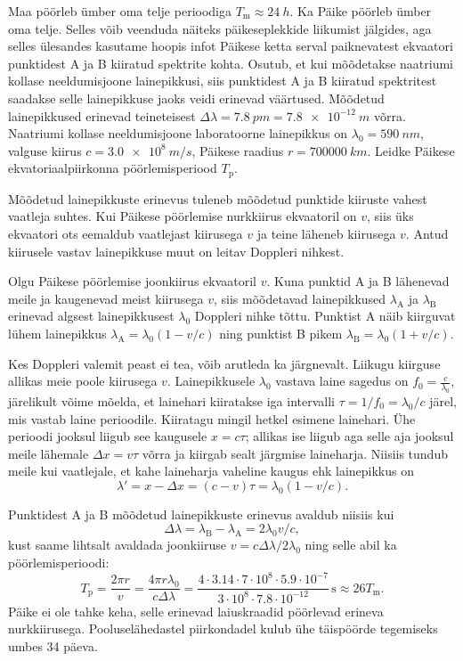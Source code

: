 
Maa pöörleb ümber oma telje perioodiga $T_\text{m}\approx\SI{24}{h}$. Ka Päike pöörleb ümber oma telje. Selles võib veenduda näiteks päikeseplekkide liikumist jälgides, aga selles ülesandes kasutame hoopis infot Päikese ketta serval paiknevatest ekvaatori punktidest A ja B kiiratud spektrite kohta. Osutub, et kui mõõdetakse naatriumi kollase neeldumisjoone lainepikkusi, siis punktidest A ja B kiiratud spektritest saadakse selle lainepikkuse jaoks veidi erinevad väärtused. Mõõdetud lainepikkused erinevad teineteisest $\Delta \lambda = \SI{7.8}{pm}=\SI{7.8e-12}{m}$ võrra. Naatriumi kollase neeldumisjoone laboratoorne lainepikkus on $\lambda_0=\SI{590}{nm}$, valguse kiirus $c=\SI{3.0e8}{m/s}$, Päikese raadius $r=\SI{700000}{km}$. Leidke Päikese ekvatoriaalpiirkonna pöörlemisperiood $T_\text{p}$.

\hint
Mõõdetud lainepikkuste erinevus tuleneb mõõdetud punktide kiiruste vahest vaatleja suhtes. Kui Päikese pöörlemise nurkkiirus ekvaatoril on $v$, siis üks ekvaatori ots eemaldub vaatlejast kiirusega $v$ ja teine läheneb kiirusega $v$. Antud kiirusele vastav lainepikkuse muut on leitav Doppleri nihkest.

\solu
Olgu Päikese pöörlemise joonkiirus ekvaatoril $v$. Kuna punktid A ja B lähenevad meile ja kaugenevad meist kiirusega $v$, siis mõõdetavad lainepikkused $\lambda_\text{A}$ ja $\lambda_\text{B}$ erinevad algsest lainepikkusest $\lambda_0$ Doppleri nihke tõttu. Punktist A näib kiirguvat lühem lainepikkus $\lambda_\text{A}=\lambda_0(1-v/c)$ ning punktist B pikem $\lambda_\text{B}=\lambda_0(1+v/c)$.

Kes Doppleri valemit peast ei tea, võib arutleda ka järgnevalt. Liikugu kiirguse allikas meie poole kiirusega $v$. Lainepikkusele $\lambda_0$ vastava laine sagedus on $f_0=\frac{c}{\lambda_0}$, järelikult võime mõelda, et lainehari kiiratakse iga intervalli $\tau = 1/f_0 = \lambda_0/c$ järel, mis vastab laine perioodile. Kiiratagu mingil hetkel esimene lainehari. Ühe perioodi jooksul liigub see kaugusele $x=c\tau$; allikas ise liigub aga selle aja jooksul meile lähemale $\Delta x = v\tau$ võrra ja kiirgab sealt järgmise laineharja. Niisiis tundub meile kui vaatlejale, et kahe laineharja vaheline kaugus ehk lainepikkus on 
\[
\lambda'=x-\Delta x=(c-v)\tau = \lambda_0(1-v/c).
\]

Punktidest A ja B mõõdetud lainepikkuste erinevus avaldub niisiis kui 
\[
\Delta\lambda = \lambda_\text{B}-\lambda_\text{A} = 2\lambda_0 v/c,
\]
kust saame lihtsalt avaldada joonkiiruse $v=c\Delta\lambda/2\lambda_0$ ning selle abil ka pöörlemisperioodi:
\[
T_\text{p}=\frac{2\pi r}{v}=\frac{4 \pi r \lambda_0}{c\Delta \lambda}=
\frac{4 \cdot 3.14 \cdot 7\cdot 10^8 \cdot 5.9 \cdot 10^{-7}}{3\cdot 10^8\cdot 7.8\cdot 10^{-12}}\,\text{s}\approx 26 \textit{T}_\mathrm{m}.
\]
Päike ei ole tahke keha, selle erinevad laiuskraadid pöörlevad erineva nurkkiirusega. Pooluselähedastel piirkondadel kulub ühe täispöörde tegemiseks umbes 34 päeva.

